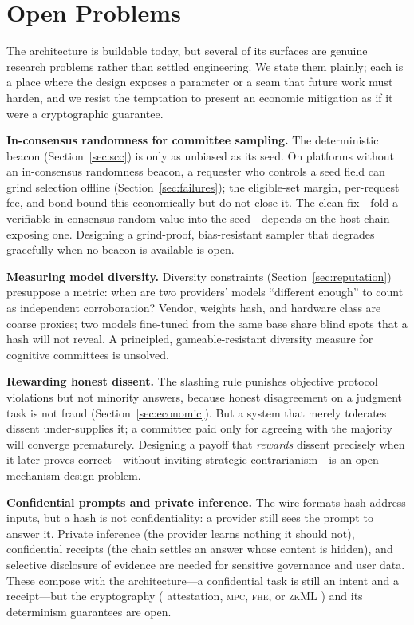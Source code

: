 \section{Open Problems}
\label{sec:open}

The architecture is buildable today, but several of its surfaces are genuine research problems rather than settled engineering. We state them plainly; each is a place where the design exposes a parameter or a seam that future work must harden, and we resist the temptation to present an economic mitigation as if it were a cryptographic guarantee.

\textbf{In-consensus randomness for committee sampling.} The deterministic beacon (Section~\ref{sec:scc}) is only as unbiased as its seed. On platforms without an in-consensus randomness beacon, a requester who controls a seed field can grind selection offline (Section~\ref{sec:failures}); the eligible-set margin, per-request fee, and bond bound this economically but do not close it. The clean fix---fold a verifiable in-consensus random value into the seed---depends on the host chain exposing one. Designing a grind-proof, bias-resistant sampler that degrades gracefully when no beacon is available is open.

\textbf{Measuring model diversity.} Diversity constraints (Section~\ref{sec:reputation}) presuppose a metric: when are two providers' models ``different enough'' to count as independent corroboration? Vendor, weights hash, and hardware class are coarse proxies; two models fine-tuned from the same base share blind spots that a hash will not reveal. A principled, gameable-resistant diversity measure for cognitive committees is unsolved.

\textbf{Rewarding honest dissent.} The slashing rule punishes objective protocol violations but not minority answers, because honest disagreement on a judgment task is not fraud (Section~\ref{sec:economic}). But a system that merely tolerates dissent under-supplies it; a committee paid only for agreeing with the majority will converge prematurely. Designing a payoff that \emph{rewards} dissent precisely when it later proves correct---without inviting strategic contrarianism---is an open mechanism-design problem.

\textbf{Confidential prompts and private inference.} The wire formats hash-address inputs, but a hash is not confidentiality: a provider still sees the prompt to answer it. Private inference (the provider learns nothing it should not), confidential receipts (the chain settles an answer whose content is hidden), and selective disclosure of evidence are needed for sensitive governance and user data. These compose with the architecture---a confidential task is still an intent and a receipt---but the cryptography (\TEE{} attestation, \textsc{mpc}, \textsc{fhe}, or \textsc{zk}ML \cite{zkml-survey}) and its determinism guarantees are open.

